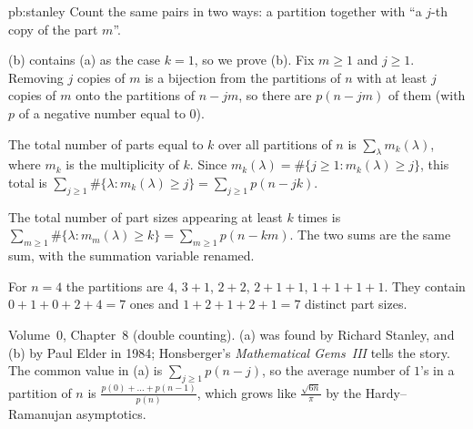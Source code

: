 \begin{solution}{pb:stanley}
\idea Count the same pairs in two ways: a partition together with ``a $j$-th copy of the part $m$''.

\writeup (b) contains (a) as the case $k=1$, so we prove (b). Fix $m\ge1$ and $j\ge1$. Removing $j$ copies of $m$ is a bijection
from the partitions of $n$ with at least $j$ copies of $m$ onto the partitions of $n-jm$, so there are $p(n-jm)$ of them (with
$p$ of a negative number equal to $0$).

The total number of parts equal to $k$ over all partitions of $n$ is $\sum_\lambda m_k(\lambda)$, where $m_k$ is the multiplicity of $k$.
Since $m_k(\lambda)=\#\{j\ge1:m_k(\lambda)\ge j\}$, this total is $\sum_{j\ge1}\#\{\lambda:m_k(\lambda)\ge j\}=\sum_{j\ge1}p(n-jk)$.

The total number of part sizes appearing at least $k$ times is $\sum_{m\ge1}\#\{\lambda:m_m(\lambda)\ge k\}=\sum_{m\ge1}p(n-km)$. The two
sums are the same sum, with the summation variable renamed.

For $n=4$ the partitions are $4$, $3+1$, $2+2$, $2+1+1$, $1+1+1+1$. They contain $0+1+0+2+4=7$ ones and $1+2+1+2+1=7$
distinct part sizes.

\tools Volume~0, Chapter~8 (double counting).
\leads (a) was found by Richard Stanley, and (b) by Paul Elder in 1984; Honsberger's \emph{Mathematical Gems~III} tells the
story. The common value in (a) is $\sum_{j\ge1}p(n-j)$, so the average number of $1$'s in a partition of $n$ is
$\frac{p(0)+\dots+p(n-1)}{p(n)}$, which grows like $\frac{\sqrt{6n}}\pi$ by the Hardy--Ramanujan asymptotics.
\end{solution}

